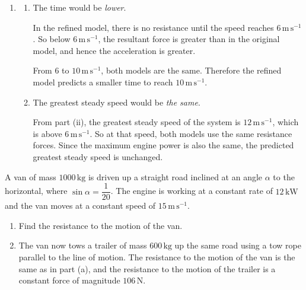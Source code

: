 \documentclass[leqno]{article}
\begin{document}
\begin{enumerate}[
  label=\textbf{\arabic*.},
  leftmargin=*,
  topsep=0pt,
  partopsep=0pt,
  parsep=0pt
]
\begin{djsSolution}
\begin{enumerate}[label=\textbf{(\roman*)}, start=1]
\begin{enumerate}[label=\textbf{(\alph*)}, start=1]
    So the magnitude of the force in the tow bar is \(2550\,\mathrm{N}\).
  \end{enumerate}

  \item
  \begin{enumerate}[label=\textbf{(\alph*)}, start=1]
    \item The time would be \emph{lower}.

    In the refined model, there is no resistance until the speed reaches \(6\,\mathrm{m\,s^{-1}}\). So below \(6\,\mathrm{m\,s^{-1}}\), the resultant force is greater than in the original model, and hence the acceleration is greater.

    From \(6\) to \(10\,\mathrm{m\,s^{-1}}\), both models are the same. Therefore the refined model predicts a smaller time to reach \(10\,\mathrm{m\,s^{-1}}\).

    \item The greatest steady speed would be \emph{the same}.

    From part (ii), the greatest steady speed of the system is \(12\,\mathrm{m\,s^{-1}}\), which is above \(6\,\mathrm{m\,s^{-1}}\). So at that speed, both models use the same resistance forces. Since the maximum engine power is also the same, the predicted greatest steady speed is unchanged.
  \end{enumerate}
\end{enumerate}
\end{djsSolution}


\newpage

\questionitem

A van of mass $1000\,\mathrm{kg}$ is driven up a straight road inclined at an angle $\alpha$ to the horizontal, where $\sin\alpha=\dfrac{1}{20}$. The engine is working at a constant rate of $12\,\mathrm{kW}$ and the van moves at a constant speed of $15\,\mathrm{m\,s^{-1}}$. \\

\begin{enumerate}[label=\textbf{(\alph*)}]
  \item Find the resistance to the motion of the van.  \\
  \item The van now tows a trailer of mass $600\,\mathrm{kg}$ up the same road using a tow rope parallel to the line of motion. The resistance to the motion of the van is the same as in part (a), and the resistance to the motion of the trailer is a constant force of magnitude $106\,\mathrm{N}$. \\


\end{enumerate}
\end{enumerate}
\end{document}
